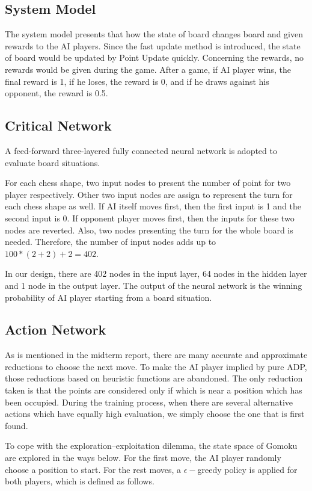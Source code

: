 \documentclass[sigconf, nonacm]{acmart}
\begin{document}
\subsection{System Model}
%
\quad The system model presents that how the state of board changes board and given rewards to the AI players.
%
Since the fast update method is introduced, the state of board would be updated by Point Update quickly.
%
Concerning the rewards, no rewards would be given during the game.
%
After a game, if AI player wins, the final reward is 1, if he loses, the reward is 0, and if he draws against his opponent, the reward
is 0.5.
%


\subsection{Critical Network}
%
\quad A feed-forward three-layered fully connected neural network is adopted to evaluate board situations.
%

%
For each chess shape, two input nodes to present the number of point for two player respectively.
%
Other two input nodes are assign to represent the turn for each chess shape as well.
%
If AI itself moves first, then the first input is 1 and the second input is 0.
%
If opponent player moves first, then the inputs for these two nodes are reverted.
%
Also, two nodes presenting the turn for the whole board is needed.
%
Therefore, the number of input nodes adds up to $100*(2+2)+2 = 402$.

%
In our design, there are 402 nodes in the input layer, 64 nodes in the
hidden layer and 1 node in the output layer.
%
The output of the neural
network is the winning probability of AI player starting from a
board situation.
%

\subsection{Action Network}
%
\quad As is mentioned in the midterm report, there are many accurate and approximate reductions to choose the next move.
%
To make the AI player implied by pure ADP, those reductions based on heuristic functions are abandoned.
%
The only reduction taken is that the points are considered only if which is 
near a position which has been occupied.
%
During the training process, when there are several alternative actions which have equally high evaluation, we simply choose the
one that is first found.
%

%
To cope with the exploration–exploitation dilemma,
the state space of Gomoku are explored in the ways below.
%
For the first move, the AI player randomly choose a position to start.
%
For the rest moves, a $\epsilon-$greedy policy is applied for both players, which is defined as follows.
\end{document}
